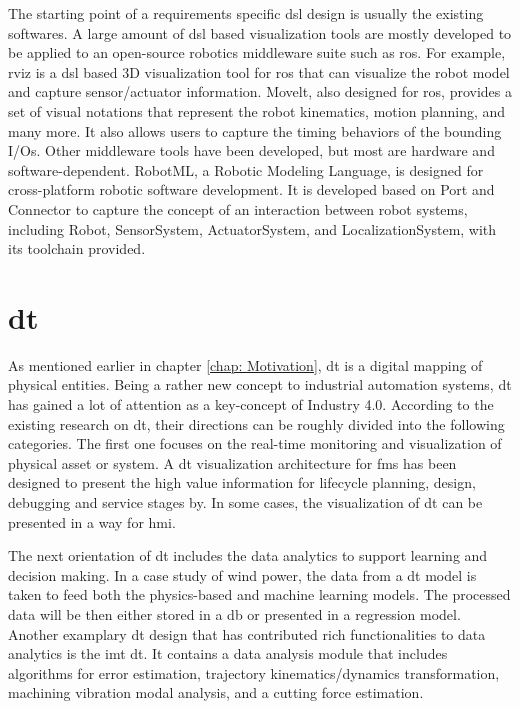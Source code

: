 The starting point of a requirements specific \gls{dsl} design is usually 
the existing softwares. 
A large amount of \gls{dsl} based visualization tools are mostly developed 
to be applied to an open-source robotics middleware suite such as \gls{ros}. 
For example, \gls{rviz} is a \gls{dsl} based 3D 
visualization tool for \gls{ros} that can visualize the robot model and 
capture sensor/actuator information. Movelt, also designed for \gls{ros}, 
provides a set of visual notations that represent the robot kinematics, 
motion planning, and many more. It also allows users to capture the 
timing behaviors of the bounding I/Os. Other middleware tools have been 
developed, but most are hardware and software-dependent. RobotML, a 
Robotic Modeling Language, is designed for cross-platform robotic 
software development\cite{hutchison_robotml_2012}. It is developed 
based on Port and Connector to
capture the concept of an interaction between robot systems, including 
Robot, SensorSystem, ActuatorSystem, and LocalizationSystem, with its toolchain 
provided\cite[fig.5]{hutchison_robotml_2012}.



\section{\gls{dt}}


As mentioned earlier in chapter \ref{chap: Motivation}, 
\gls{dt} is a digital mapping of physical entities. Being a rather new concept to 
industrial automation systems, \gls{dt} has gained a lot of attention as a key-concept 
of Industry 4.0. According to the existing research on \gls{dt}, their 
directions can be roughly divided into the following categories. The first one 
focuses on the real-time monitoring and visualization of physical asset or system. 
A \gls{dt} visualization architecture for \gls{fms} has been designed to present 
the high value information for lifecycle planning, design, debugging and service 
stages by\cite{fan_digital-twin_2021}. In some cases, the visualization of \gls{dt} 
can be presented in a way for \gls{hmi}\cite{schroeder_visualising_2016}. 


The next orientation of \gls{dt} includes the data analytics to support 
learning and decision making. In a case study of wind power, the data from 
a \gls{dt} model is taken to feed both the physics-based and 
machine learning models\cite{erikstad_merging_nodate}. The processed 
data will be then either stored in a \gls{db} or presented in a regression model. 
Another examplary \gls{dt} design that has contributed rich functionalities to 
data analytics is the \gls{imt} \gls{dt}\cite{tong_real-time_2020}. 
It contains a data analysis module 
that includes algorithms for error estimation, trajectory kinematics/dynamics 
transformation, machining vibration modal analysis, and a cutting force
estimation.

